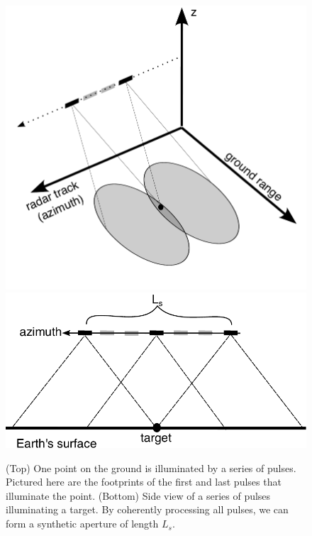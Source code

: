 

\begin{figure}
	\label{fig:ch3-synth-aper}
	\centering
	\includegraphics[width=0.8\linewidth]{figures/chapter3-sar/ch3-synth-aper2.pdf}
	\includegraphics[width=0.99\linewidth]{figures/chapter3-sar/ch3-sar-synthetic-aperture.pdf}
	\caption[Formation of a synthetic aperture]{
		(Top) One point on the ground is illuminated by a series of pulses. Pictured here are the footprints of the first and last pulses that illuminate the point. 
		(Bottom) Side view of a series of pulses illuminating a target. By coherently processing all pulses, we can form a synthetic aperture of length $L_s$.
	}
\end{figure}


